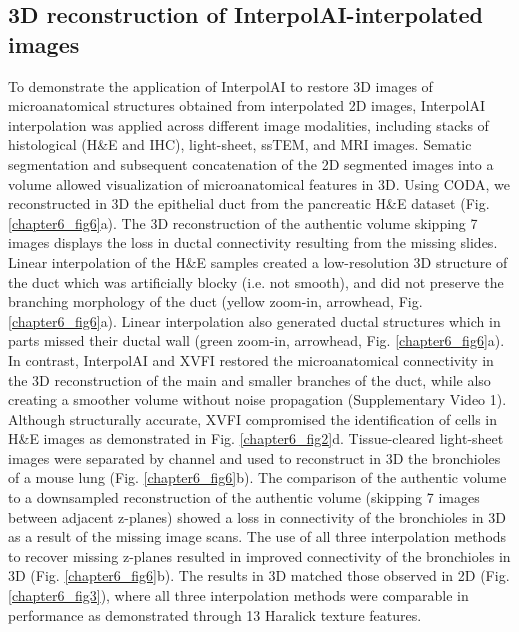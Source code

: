\begin{refsection}
    \section{3D reconstruction of InterpolAI-interpolated images}
    To demonstrate the application of InterpolAI to restore 3D images of microanatomical structures obtained from interpolated 2D images, InterpolAI interpolation was applied across different image modalities, including stacks of histological (H\&E and IHC), light-sheet, ssTEM, and MRI images. Sematic segmentation and subsequent concatenation of the 2D segmented images into a volume allowed visualization of microanatomical features in 3D.
    Using CODA, we reconstructed in 3D the epithelial duct from the pancreatic H\&E dataset (Fig. \ref{chapter6_fig6}a). The 3D reconstruction of the authentic volume skipping 7 images displays the loss in ductal connectivity resulting from the missing slides. Linear interpolation of the H\&E samples created a low-resolution 3D structure of the duct which was artificially blocky (i.e. not smooth), and did not preserve the branching morphology of the duct (yellow zoom-in, arrowhead, Fig. \ref{chapter6_fig6}a). Linear interpolation also generated ductal structures which in parts missed their ductal wall (green zoom-in, arrowhead, Fig. \ref{chapter6_fig6}a).  In contrast, InterpolAI and XVFI restored the microanatomical connectivity in the 3D reconstruction of the main and smaller branches of the duct, while also creating a smoother volume without noise propagation (Supplementary Video 1). Although structurally accurate, XVFI compromised the identification of cells in H\&E images as demonstrated in Fig. \ref{chapter6_fig2}d.   
    Tissue-cleared light-sheet images were separated by channel and used to reconstruct in 3D the bronchioles of a mouse lung (Fig. \ref{chapter6_fig6}b). The comparison of the authentic volume to a downsampled reconstruction of the authentic volume (skipping 7 images between adjacent z-planes) showed a loss in connectivity of the bronchioles in 3D as a result of the missing image scans. The use of all three interpolation methods to recover missing z-planes resulted in improved connectivity of the bronchioles in 3D (Fig. \ref{chapter6_fig6}b). The results in 3D matched those observed in 2D (Fig. \ref{chapter6_fig3}), where all three interpolation methods were comparable in performance as demonstrated through 13 Haralick texture features.   

\end{refsection}
